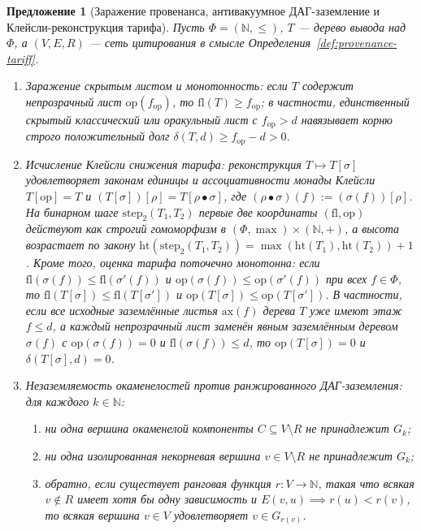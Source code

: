 \documentclass[11pt]{article}
\theoremstyle{plain}
\newtheorem{proposition}[theorem]{Предложение}
\theoremstyle{definition}
\begin{document}
\begin{proposition}[Заражение провенанса, антивакуумное ДАГ-заземление и Клейсли-реконструкция тарифа]\label{prop:provenance-grounding}
Пусть $\Phi = (\mathbb{N}, \le)$, $T$ --- дерево вывода над $\Phi$, а $(V, E, R)$ --- сеть цитирования в смысле Определения~\ref{def:provenance-tariff}.
\begin{enumerate}[nosep,label=(\roman*)]
\item \emph{Заражение скрытым листом и монотонность}: если $T$ содержит непрозрачный лист $\mathrm{op}(f_{\mathrm{op}})$, то $\mathrm{fl}(T) \ge f_{\mathrm{op}}$; в частности, единственный скрытый классический или оракульный лист с $f_{\mathrm{op}} > d$ навязывает корню строго положительный долг $\delta(T, d) \ge f_{\mathrm{op}} - d > 0$.
\item \emph{Исчисление Клейсли снижения тарифа}: реконструкция $T \mapsto T[\sigma]$ удовлетворяет законам единицы и ассоциативности монады Клейсли $T[\mathrm{op}] = T$ и $(T[\sigma])[\rho] = T[\rho \bullet \sigma]$, где $(\rho \bullet \sigma)(f) := (\sigma(f))[\rho]$. На бинарном шаге $\mathrm{step}_2(T_1, T_2)$ первые две координаты $(\mathrm{fl}, \mathrm{op})$ действуют как строгий гомоморфизм в $(\Phi, \max) \times (\mathbb{N}, +)$, а высота возрастает по закону $\mathrm{ht}(\mathrm{step}_2(T_1, T_2)) = \max(\mathrm{ht}(T_1), \mathrm{ht}(T_2)) + 1$. Кроме того, оценка тарифа поточечно монотонна: если $\mathrm{fl}(\sigma(f)) \le \mathrm{fl}(\sigma'(f))$ и $\mathrm{op}(\sigma(f)) \le \mathrm{op}(\sigma'(f))$ при всех $f \in \Phi$, то $\mathrm{fl}(T[\sigma]) \le \mathrm{fl}(T[\sigma'])$ и $\mathrm{op}(T[\sigma]) \le \mathrm{op}(T[\sigma'])$. В частности, если все исходные заземлённые листья $\mathrm{ax}(f)$ дерева $T$ уже имеют этаж $f \le d$, а каждый непрозрачный лист заменён явным заземлённым деревом $\sigma(f)$ с $\mathrm{op}(\sigma(f)) = 0$ и $\mathrm{fl}(\sigma(f)) \le d$, то $\mathrm{op}(T[\sigma]) = 0$ и $\delta(T[\sigma], d) = 0$.
\item \emph{Незаземляемость окаменелостей против ранжированного ДАГ-заземления}: для каждого $k \in \mathbb{N}$:
  \begin{enumerate}[nosep,label=(\alph*)]
  \item ни одна вершина окаменелой компоненты $C \subseteq V \setminus R$ не принадлежит $G_k$;
  \item ни одна изолированная некорневая вершина $v \in V \setminus R$ не принадлежит $G_k$;
  \item обратно, если существует ранговая функция $r : V \to \mathbb{N}$, такая что всякая $v \notin R$ имеет хотя бы одну зависимость и $E(v, u) \implies r(u) < r(v)$, то всякая вершина $v \in V$ удовлетворяет $v \in G_{r(v)}$.
  \end{enumerate}
\end{enumerate}
\end{proposition}
\end{document}
